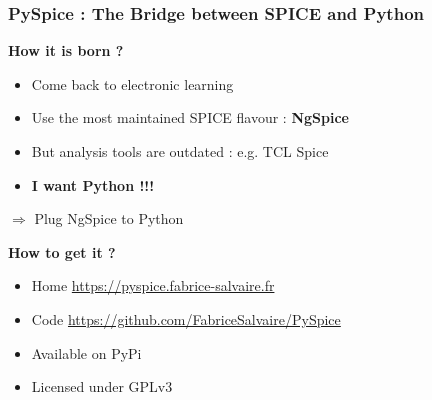 
\begin{frame}
  \frametitle{PySpice :  The Bridge between SPICE and Python}
  \textbf{How it is born ?}
  \begin{itemize}
  \item Come back to electronic learning
  \item Use the most maintained SPICE flavour : \textbf{NgSpice}
  \item But analysis tools are outdated : e.g. TCL Spice
  \item \textbf{I want Python !!!}
  \end{itemize}
  \vspace{1.5em}
  \centerline{\alert{$\Longrightarrow$ Plug NgSpice to Python}}
  \vspace{1.5em}
  \textbf{How to get it ?}
  \begin{itemize}
  \item Home \url{https://pyspice.fabrice-salvaire.fr}
  \item Code \url{https://github.com/FabriceSalvaire/PySpice}
  \item Available on PyPi
  \item Licensed under GPLv3
  \end{itemize}
\end{frame}

